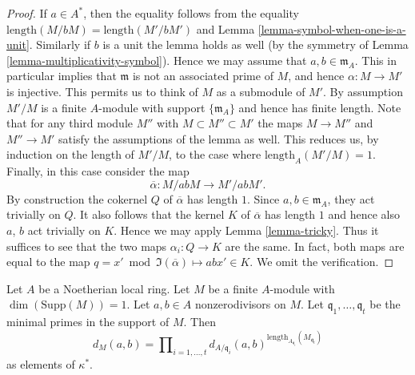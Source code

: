 \begin{proof}
If $a \in A^*$, then the equality follows from the
equality $\text{length}(M/bM) = \text{length}(M'/bM')$
and Lemma \ref{lemma-symbol-when-one-is-a-unit}.
Similarly if $b$ is a unit the lemma holds as well
(by the symmetry of Lemma \ref{lemma-multiplicativity-symbol}).
Hence we may assume that $a, b \in \mathfrak m_A$.
This in particular implies that $\mathfrak m$ is not
an associated prime of $M$, and hence $\alpha : M \to M'$
is injective. This permits us to think of $M$ as a submodule of $M'$.
By assumption $M'/M$ is a finite $A$-module with support
$\{\mathfrak m_A\}$ and hence has finite length.
Note that for any third module $M''$ with $M \subset M'' \subset M'$
the maps $M \to M''$ and $M'' \to M'$ satisfy the assumptions of the lemma
as well. This reduces us, by induction on the length of $M'/M$,
to the case where $\text{length}_A(M'/M) = 1$.
Finally, in this case consider the map
$$
\overline{\alpha} : M/abM \longrightarrow M'/abM'.
$$
By construction the cokernel $Q$ of $\overline{\alpha}$ has
length $1$. Since $a, b \in \mathfrak m_A$, they act trivially on
$Q$. It also follows that the kernel $K$ of $\overline{\alpha}$ has
length $1$ and hence also $a$, $b$ act trivially on $K$.
Hence we may apply Lemma \ref{lemma-tricky}. Thus it suffices to see
that the two maps $\alpha_i : Q \to K$ are the same.
In fact, both maps are equal to the map
$q = x' \bmod \Im(\overline{\alpha}) \mapsto abx' \in K$.
We omit the verification.
\end{proof}

\begin{lemma}
\label{lemma-compute-symbol-M}
Let $A$ be a Noetherian local ring.
Let $M$ be a finite $A$-module with $\dim(\text{Supp}(M)) = 1$.
Let $a, b \in A$ nonzerodivisors on $M$.
Let $\mathfrak q_1, \ldots, \mathfrak q_t$ be the minimal
primes in the support of $M$. Then
$$
d_M(a, b)
=
\prod\nolimits_{i = 1, \ldots, t}
d_{A/\mathfrak q_i}(a, b)^{
\text{length}_{A_{\mathfrak q_i}}(M_{\mathfrak q_i})}
$$
as elements of $\kappa^*$.
\end{lemma}

